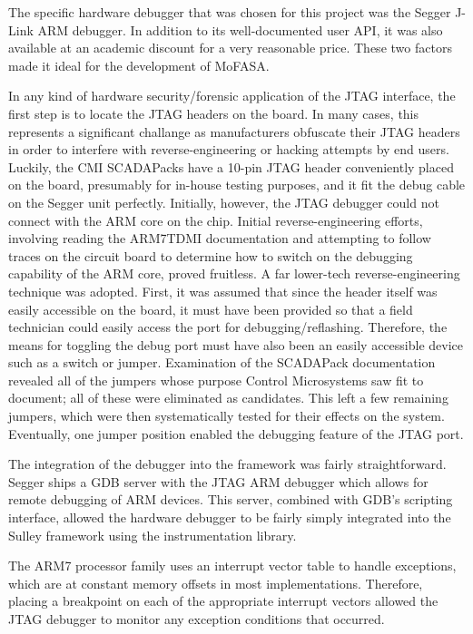 \documentclass{report}
\begin{document}
The specific hardware debugger that was chosen for this project was the Segger J-Link ARM debugger. In addition to its well-documented user API, it was also available
at an academic discount for a very reasonable price. These two factors made it ideal for the development of MoFASA.

In any kind of hardware security/forensic application of the JTAG interface, the first step is to locate the JTAG headers on the board. In many cases, this represents
a significant challange as manufacturers obfuscate their JTAG headers in order to interfere with reverse-engineering or hacking attempts by end users.
Luckily, the CMI SCADAPacks have a 10-pin JTAG header conveniently placed on the board, presumably for in-house testing purposes, and it fit the debug cable on the Segger
unit perfectly. Initially, however, the JTAG debugger could not connect with the ARM core on the chip. Initial reverse-engineering efforts, involving reading the ARM7TDMI
documentation and attempting to follow traces on the circuit board to determine how to switch on the debugging capability of the ARM core, proved fruitless. A far lower-tech
reverse-engineering technique was adopted. First, it was assumed that since the header itself was easily accessible on the board, it must have been provided so that
a field technician could easily access the port for debugging/reflashing. Therefore, the means for toggling the debug port must have also been an easily accessible
device such as a switch or jumper. Examination of the SCADAPack documentation revealed all of the jumpers whose purpose Control Microsystems saw fit to document; all
of these were eliminated as candidates. This left a few remaining jumpers, which were then systematically tested for their effects on the system. Eventually, one jumper
position enabled the debugging feature of the JTAG port.

The integration of the debugger into the framework was fairly straightforward. Segger ships a GDB server with the JTAG ARM debugger which allows for remote debugging of
ARM devices. This server, combined with GDB's scripting interface, allowed the hardware debugger to be fairly simply integrated into the Sulley framework using the 
instrumentation library.

The ARM7 processor family uses an interrupt vector table to handle exceptions, which are at constant memory offsets in most implementations. Therefore, placing a breakpoint
on each of the appropriate interrupt vectors allowed the JTAG debugger to monitor any exception conditions that occurred. 
\end{document}
